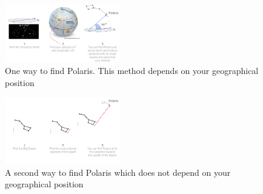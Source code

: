 \documentclass[a4paper,landscape,english,12pt]{article}
\begin{document}
\begin{figure}[hbt]
	\includegraphics[width=5cm]{../Figures/Polaris-1.jpg}
	\caption{One way to find Polaris. This method depends on your geographical position}		
	\label{fig:polaris1}
\end{figure} 


\begin{figure}[hbt]
	\includegraphics[width=5cm]{../Figures/Polaris-2.jpg}
	\caption{A second way to find Polaris which does not depend on your geographical position}		
	\label{fig:polaris2}
\end{figure} 
\end{document}
